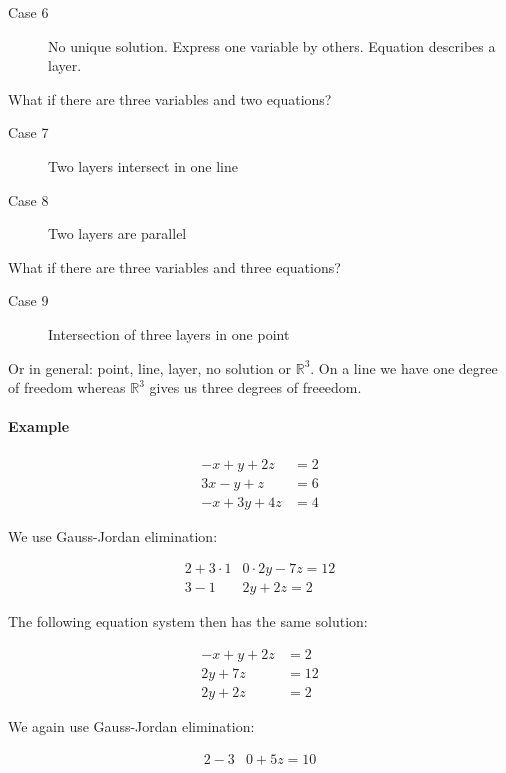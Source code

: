 \documentclass[a4paper,landscape,twocolumn]{article}
\begin{document}
\begin{description}
  \item[Case 6]
    No unique solution. Express one variable by others.
    Equation describes a layer.
\end{description}

What if there are three variables and two equations?

\begin{description}
  \item[Case 7] Two layers intersect in one line
  \item[Case 8] Two layers are parallel
\end{description}

What if there are three variables and three equations?

\begin{description}
  \item[Case 9] Intersection of three layers in one point
\end{description}

Or in general: point, line, layer, no solution or $\mathbb{R}^3$.
On a line we have one degree of freedom whereas $\mathbb{R}^3$ gives us three degrees of freeedom.

\paragraph{Example}
\begin{align*}
  -x  +y +2z &= 2 \\
  3x  -y  +z  &=6 \\
  -x +3y +4z &= 4
\end{align*}

We use Gauss-Jordan elimination:

\begin{align*}
  2 + 3\cdot 1 & 0\cdot 2y - 7z = 12 \\
  3 - 1        & 2y + 2z = 2
\end{align*}

The following equation system then has the same solution:

\begin{align*}
  -x + y + 2z &= 2 \\
  2y + 7z &= 12 \\
  2y + 2z &= 2
\end{align*}

We again use Gauss-Jordan elimination:

\begin{align*}
  2 - 3 & 0 + 5z = 10
\end{align*}
\end{document}
